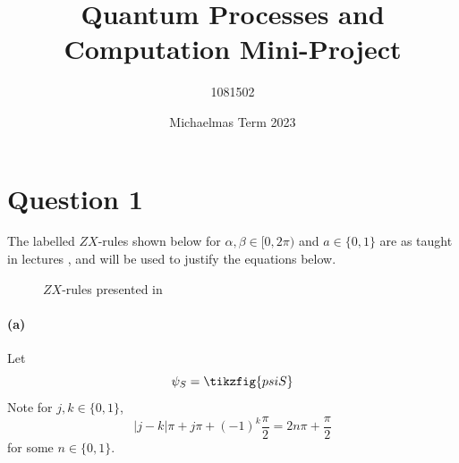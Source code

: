 \documentclass[11pt]{article} %
\title{Quantum Processes and Computation Mini-Project}
\author{1081502}
\date{Michaelmas Term 2023}
\theoremstyle{definition}
\begin{document}
%
\maketitle




\section*{Question 1}
\addtocounter{section}{1}
The labelled $ZX$-rules shown below \cite{Kissinger_2019} for $\alpha,\beta\in[0,2\pi)$ and $a\in\{0,1\}$ 
are as taught in lectures \cite{coecke2017picturing}, and will be used to justify the equations below.
\setlength{\tabcolsep}{10pt}
\begin{figure}[h!]
\caption{$ZX$-rules presented in \cite{Kissinger_2019}}\label{table:rewrite}
\end{figure}

\clearpage
\paragraph{(a)}
Let 
\[\psi_S= \tikzfig{psiS}\]
Note for $j,k\in\{0,1\}$, 
\[|j-k|\pi + j\pi + (-1)^k \frac{\pi}{2} = 2n\pi + \frac{\pi}{2}\]
for some $n\in\{0,1\}$.
\end{document}
